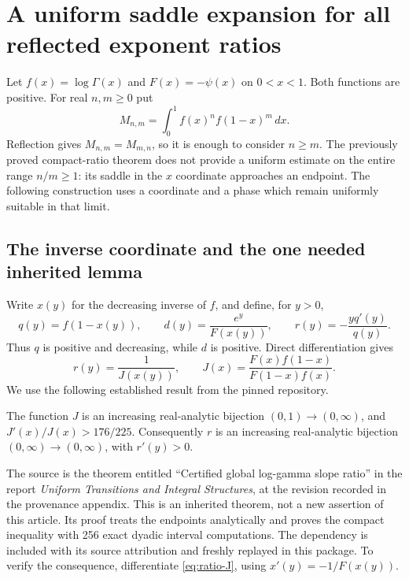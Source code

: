 \section{A uniform saddle expansion for all reflected exponent ratios}
\label{sec:all-ratios}

Let $f(x)=\log\Gamma(x)$ and $F(x)=-\psi(x)$ on $0<x<1$.
Both functions are positive. For real $n,m\ge0$ put
\[
 M_{n,m}=\int_0^1 f(x)^n f(1-x)^m\,dx.
\]
Reflection gives $M_{n,m}=M_{m,n}$, so it is enough to consider
$n\ge m$. The previously proved compact-ratio theorem does not provide a uniform
estimate on the entire range $n/m\ge1$: its saddle in the $x$ coordinate
approaches an endpoint. The following construction uses a coordinate
and a phase which remain uniformly suitable in that limit.

\subsection{The inverse coordinate and the one needed inherited lemma}

Write $x(y)$ for the decreasing inverse of $f$, and define, for $y>0$,
\begin{equation}\label{eq:ratio-definitions}
 q(y)=f(1-x(y)),\qquad
 d(y)=\frac{e^y}{F(x(y))},\qquad
 r(y)=-\frac{yq'(y)}{q(y)}.
\end{equation}
Thus $q$ is positive and decreasing, while $d$ is positive. Direct
differentiation gives
\begin{equation}\label{eq:ratio-J}
 r(y)=\frac{1}{J(x(y))},\qquad
 J(x)=\frac{F(x)f(1-x)}{F(1-x)f(x)}.
\end{equation}
We use the following established result from the pinned repository.

\begin{lemma}\label{lem:inherited-J}
The function $J$ is an increasing real-analytic bijection
$(0,1)\longrightarrow(0,\infty)$, and
$J'(x)/J(x)>176/225$. Consequently $r$ is an increasing
real-analytic bijection $(0,\infty)\longrightarrow(0,\infty)$,
with $r'(y)>0$.
\end{lemma}

The source is the theorem entitled ``Certified global log-gamma slope
ratio'' in the report \emph{Uniform Transitions and Integral Structures},
at the revision recorded in the provenance appendix. This is an inherited
theorem, not a new assertion of this article. Its proof treats the
endpoints analytically and proves the compact inequality with 256 exact
dyadic interval computations. The dependency is included with its source
attribution and freshly replayed in this package. To verify the consequence,
differentiate \eqref{eq:ratio-J}, using $x'(y)=-1/F(x(y))$.

